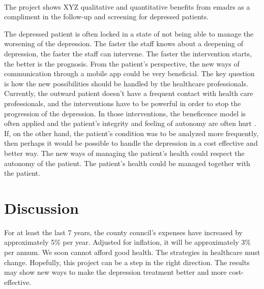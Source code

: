 \documentclass[12pt,a4paper,oneside]{article}
\renewcommand{\_}{\hspace{0.1cm}}
\let\oldcite\cite
\renewcommand*\cite[1]{\textsuperscript{\oldcite{#1}}}
\begin{document}
\ \\
The project shows XYZ qualitative and quantitative benefits from e{\sc madrs} as a compliment in the follow-up and screening for depressed patients.

The depressed patient is often locked in a state of not being able to manage the worsening of the depression. The faster the staff knows about a deepening of depression, the faster the staff can intervene. The faster the intervention starts, the better is the prognosis. From the patient's perspective, the new ways of communication through a mobile app could be very beneficial. The key question is how the new possibilities should be handled by the healthcare professionals. Currently, the outward patient doesn't have a frequent contact with health care professionals, and the interventions have to be powerful in order to stop the progression of the depression. In those interventions, the beneficence model is often applied and the patient's integrity and feeling of autonomy are often hurt \cite{ethics1}. If, on the other hand, the patient's condition was to be analyzed more frequently, then perhaps it would be possible to handle the depression in a cost effective and better way. The new ways of managing the patient's health could respect the autonomy of the patient. The patient's health could be managed together with the patient\cite{leader1}. 


\section*{Discussion}
For at least the last 7 years, the county council's expenses have increased by approximately 5\% per year. Adjusted for inflation, it will be approximately 3\% per annum\cite{numbers3.1, numbers3.2}. We soon cannot afford good health. The strategies in healthcare must change. Hopefully, this project can be a step in the right direction. The results may show new ways to make the depression treatment better and more cost-effective.


\end{document}
